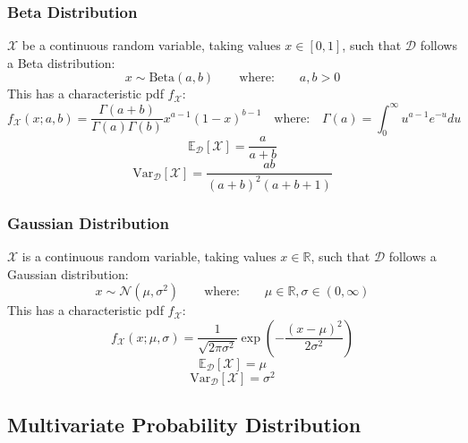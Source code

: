 \subsubsection{Beta Distribution}
$\mathcal{X}$ be a continuous random variable, taking values $x \in [0,1]$,
such that $\mathcal{D}$ follows a Beta distribution:
\[x \sim \mbox{Beta}(a,b) \qquad \mbox{where:} \qquad a,b >0\]
This has a characteristic pdf $f_{\mathcal{X}}$:
\[f_{\mathcal{X}}(x; a, b) = \frac{\Gamma(a+b)}{\Gamma(a) \Gamma(b)} x^{a-1} {(1-x)}^{b-1} \quad \mbox{where:} \quad \Gamma(a) = \int_{0}^{\infty} u^{a-1} e^{-u} du\]
\[\mathbb{E}_{\mathcal{D}}[\mathcal{X}] = \frac{a}{a+b}\]
\[\mbox{Var}_{\mathcal{D}}[\mathcal{X}] = \frac{ab}{{(a+b)}^2(a+b+1)}\]
\subsubsection{Gaussian Distribution}
$\mathcal{X}$ is a continuous random variable, taking values $x \in
\mathbb{R}$, such that $\mathcal{D}$ follows a Gaussian distribution:
\[x \sim \mathcal{N}(\mu,\sigma^2) \qquad \text{where:} \qquad \mu \in \mathbb{R}, \sigma \in (0, \infty)\]
This has a characteristic pdf $f_{\mathcal{X}}$:
\[f_{\mathcal{X}}(x ; \mu, \sigma) = \frac{1}{\sqrt{2 \pi \sigma^2}} \exp \left( -\frac{{(x-\mu)}^2}{2 {\sigma}^2} \right)\]
\[\mathbb{E}_{\mathcal{D}}[\mathcal{X}] = \mu\]
\[\text{Var}_{\mathcal{D}}[\mathcal{X}] = \sigma^2\]


\subsection{Multivariate Probability Distribution}
